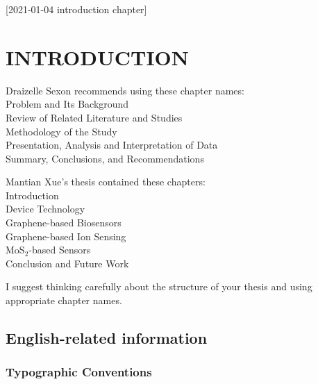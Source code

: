 [2021-01-04 introduction chapter]

\chapter{INTRODUCTION}

Draizelle Sexon \cite{sexon2012} recommends using these chapter names:\\
 Problem and Its Background\\
 Review of Related Literature and Studies\\
 Methodology of the Study\\
 Presentation, Analysis and Interpretation of Data\\
 Summary, Conclusions, and Recommendations

Mantian Xue's \cite{xue2019} thesis contained these chapters:\\
 Introduction\\
 Device Technology\\
 Graphene-based Biosensors\\
 Graphene-based Ion Sensing\\
 MoS${}_2$-based Sensors\\
 Conclusion and Future Work

I suggest thinking carefully about the structure of your thesis
and using appropriate chapter names.


\section{English-related information}

\subsection{Typographic Conventions}

